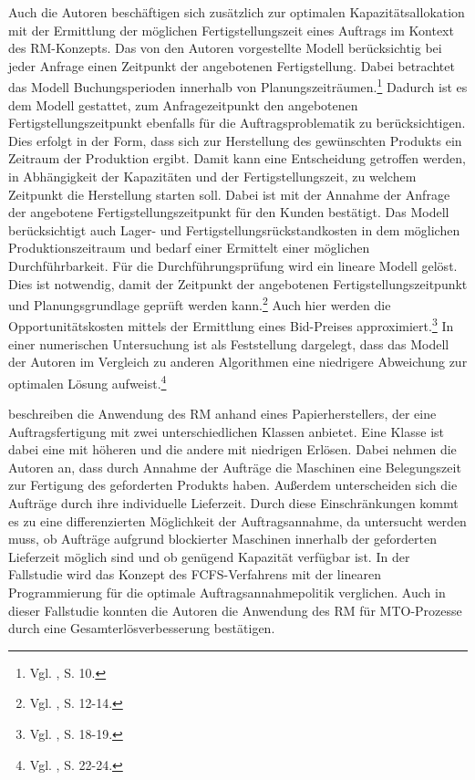 Auch die Autoren \cite{guhlich2015revenue} beschäftigen sich zusätzlich zur optimalen Kapazitätsallokation mit der Ermittlung der möglichen Fertigstellungszeit eines Auftrags im Kontext des RM-Konzepts. Das von den Autoren vorgestellte Modell berücksichtig bei jeder Anfrage einen Zeitpunkt der angebotenen Fertigstellung. Dabei betrachtet das Modell Buchungsperioden innerhalb von Planungszeiträumen.\footnote{Vgl. \cite{guhlich2015revenue}, S. 10.} Dadurch ist es dem Modell gestattet, zum Anfragezeitpunkt den angebotenen Fertigstellungszeitpunkt ebenfalls für die Auftragsproblematik zu berücksichtigen. Dies erfolgt in der Form, dass sich zur Herstellung des gewünschten Produkts ein Zeitraum der Produktion ergibt. Damit kann eine Entscheidung getroffen werden, in Abhängigkeit der Kapazitäten und der Fertigstellungszeit, zu welchem Zeitpunkt die Herstellung starten soll. Dabei ist mit der Annahme der Anfrage der angebotene Fertigstellungszeitpunkt für den Kunden bestätigt. Das Modell berücksichtigt auch Lager- und Fertigstellungsrückstandkosten in dem möglichen Produktionszeitraum und bedarf einer Ermittelt einer möglichen Durchführbarkeit. Für die Durchführungsprüfung wird ein lineare Modell gelöst. Dies ist notwendig, damit der Zeitpunkt der angebotenen Fertigstellungszeitpunkt und Planungsgrundlage geprüft werden kann.\footnote{Vgl. \cite{guhlich2015revenue}, S. 12-14.} Auch hier werden die Opportunitätskosten mittels der Ermittlung eines Bid-Preises approximiert.\footnote{Vgl. \cite{guhlich2015revenue}, S. 18-19.} In einer numerischen Untersuchung ist als Feststellung dargelegt, dass das Modell der Autoren im Vergleich zu anderen Algorithmen eine niedrigere Abweichung zur optimalen Lösung aufweist.\footnote{Vgl. \cite{guhlich2015revenue}, S. 22-24.}

\cite{kuhn2004revenue} beschreiben die Anwendung des RM anhand eines Papierherstellers, der eine Auftragsfertigung mit zwei unterschiedlichen Klassen anbietet. Eine Klasse ist dabei eine mit höheren und die andere mit niedrigen Erlösen. Dabei nehmen die Autoren an, dass durch Annahme der Aufträge die Maschinen eine Belegungszeit zur Fertigung des geforderten Produkts haben. Außerdem unterscheiden sich die Aufträge durch ihre individuelle Lieferzeit. Durch diese Einschränkungen kommt es zu eine differenzierten Möglichkeit der Auftragsannahme, da untersucht werden muss, ob Aufträge aufgrund blockierter Maschinen innerhalb der geforderten Lieferzeit möglich sind und ob genügend Kapazität verfügbar ist. In der Fallstudie wird das Konzept des FCFS-Verfahrens mit der linearen Programmierung für die optimale Auftragsannahmepolitik verglichen. Auch in dieser Fallstudie konnten die Autoren die Anwendung des RM für MTO-Prozesse durch eine Gesamterlösverbesserung bestätigen.

